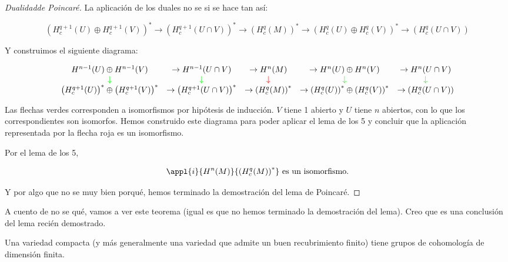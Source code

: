 \documentclass[palatino, bibnumbers]{apuntes}
\begin{document}
\begin{proof}[Dualidad\IS de Poincaré]
La aplicación de los duales no se si se hace tan así:

\begin{equation}
\label{absurdo:2}
\left(H_c^{q+1}(U) \oplus H_c^{q+1}(V) \right)^{\ast}\to\left(H_c^{q+1}(U\cap V) \right)^{\ast}\to\left(H_c^q(M) \right)^{\ast}\to\left(H_c^{q}(U)\oplus H_c^q(V) \right)^{\ast}\to\left(H_c^q(U\cap V)\right)
\end{equation}



Y construimos el siguiente diagrama:

\begin{equation}
\label{absurdo:4}
\begin{array}{ccccc}
H^{n-1}(U) \oplus H^{n-1}(V) 	&	\to H^{n-1}(U\cap V) 	&	\to H^n(M) 	&	\to H^{n}(U)\oplus H^n(V) 	&	\to H^n(U\cap V)\\
\textcolor{green}{\downarrow} & \textcolor{green}{\downarrow} & \textcolor{red}{\downarrow} & \textcolor{green}{\downarrow} & \textcolor{green}{\downarrow} \\
\left(H_c^{q+1}(U)\right)^{\ast} \oplus \left(H_c^{q+1}(V) \right)^{\ast}	&	\to\left(H_c^{q+1}(U\cap V) \right)^{\ast}	&	\to\left(H_c^q(M) \right)^{\ast}	&	\to\left(H_c^{q}(U)\right)^{\ast}\oplus \left(H_c^q(V) \right)^{\ast}	&	\to\left(H_c^q(U\cap V)\right)
\end{array}
\end{equation}

Las flechas verdes corresponden a isomorfismos por hipótesis de inducción. $V$ tiene 1 abierto y $U$ tiene $n$ abiertos, con lo que los correspondientes son isomorfos. Hemos construido este diagrama para poder aplicar el lema de los 5 y concluir que la aplicación representada por la flecha roja es un isomorfismo.

Por el lema de los 5,

\[
\appl{i}{H^n(M)}{\left(H_c^q(M)\right)^{\ast}} \text{ es un isomorfismo.}
\]

Y por algo que no se muy bien porqué, hemos terminado la demostración del lema de Poincaré.

\end{proof}

A cuento de no se qué, vamos a ver este teorema (igual es que no hemos terminado la demostración del lema). Creo que es una conclusión del lema recién demostrado.

\begin{theorem}
Una variedad compacta (y más generalmente una variedad que admite un buen recubrimiento finito) tiene grupos de cohomología de dimensión finita.
\end{theorem}
\end{document}
